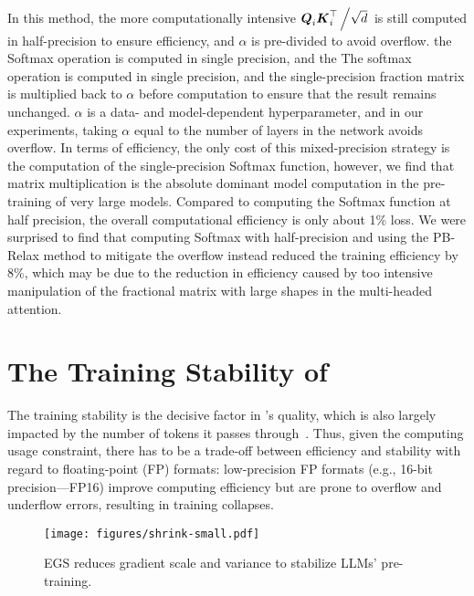 {In this method, the more computationally intensive $\boldsymbol{Q}_i\boldsymbol{K}_i^{\top}\left/\sqrt{d}\right.$ is still computed in half-precision to ensure efficiency, and $\alpha$ is pre-divided to avoid overflow. the Softmax operation is computed in single precision, and the The softmax operation is computed in single precision, and the single-precision fraction matrix is multiplied back to $\alpha$ before computation to ensure that the result remains unchanged. $\alpha$ is a data- and model-dependent hyperparameter, and in our experiments, taking $\alpha$ equal to the number of layers in the network avoids overflow. In terms of efficiency, the only cost of this mixed-precision strategy is the computation of the single-precision Softmax function, however, we find that matrix multiplication is the absolute dominant model computation in the pre-training of very large models. Compared to computing the Softmax function at half precision, the overall computational efficiency is only about 1\% loss. We were surprised to find that computing Softmax with half-precision and using the PB-Relax method to mitigate the overflow instead reduced the training efficiency by 8\%, which may be due to the reduction in efficiency caused by too intensive manipulation of the fractional matrix with large shapes in the multi-headed attention.
}

\section{The Training Stability of \glm}

The training stability is the decisive factor in \glm's quality, which is also largely impacted by the number of tokens it passes through~\citep{hoffmann2022training}. 
Thus, given the computing usage constraint, there has to be a trade-off between efficiency and stability with regard to floating-point (FP) formats: 
low-precision FP formats (e.g., 16-bit precision---FP16) improve computing efficiency but are prone to overflow and underflow errors, resulting in training collapses. 

 \begin{wrapfigure}{r}{4.3cm}
    \centering
    \vspace{-3mm}
    \texttt{[image: figures/shrink-small.pdf]}
    \vspace{-7mm}
    \caption{EGS reduces gradient scale and variance to stabilize LLMs' pre-training.}
    \label{fig:shrink}
    \vspace{-8mm}
\end{wrapfigure}

